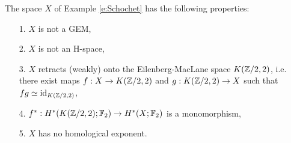 The space $X$ of Example \ref{e:Schochet} has the following properties:
\begin{itemize}
\item[1.]{$X$ is not a GEM,}
\item[2.]{$X$ is not an H-space,}
\item[3.]{$X$ retracts (weakly) onto the Eilenberg-MacLane space $K(\mathbb{Z}/2,2)$, i.e. there exist maps $f:X\to K(\mathbb{Z}/2,2)$ and $g:K(\mathbb{Z}/2,2)\to X$ such that $fg\simeq\operatorname{id}_{K(\mathbb{Z}/2,2)}$,}
\item[4.]{$f^*:H^*(K(\mathbb{Z}/2,2);\mathbb{F}_2)\to H^*(X;\mathbb{F}_2)$ is a monomorphism,}
\item[5.]{$X$ has no homological exponent.}
\end{itemize}
\endinput